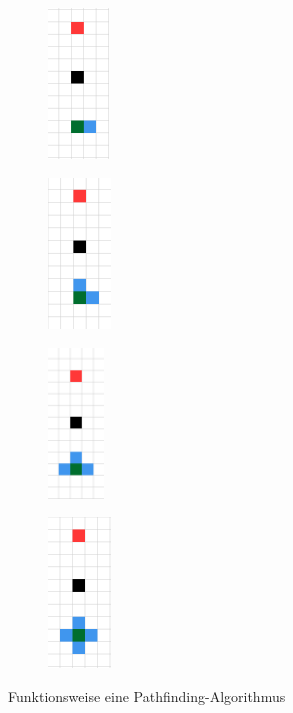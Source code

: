 {{{{			\begin{figure}[H]
				\captionsetup{width=.8\linewidth}
				\centering
				\begin{subfigure}[h]{.19\linewidth}
					\centering
					\includegraphics[scale=0.6, height =4cm]{Bilder/pathfinding_procedure_1.png}
					\label{pic:pathproc1}
				\end{subfigure}%
				\qquad %
				\begin{subfigure}[h]{.19\linewidth}
					\centering
					\includegraphics[scale=0.6, height =4cm]{Bilder/pathfinding_procedure_2.png}
					\label{pic:pathpro2}
				\end{subfigure}%
				\qquad
				\begin{subfigure}[h]{.19\linewidth}
					\centering
					\includegraphics[scale=0.6, height =4cm]{Bilder/pathfinding_procedure_3.png}
					\label{pic:pathproc3}
				\end{subfigure}%
				\qquad %
				\begin{subfigure}[h]{.19\linewidth}
					\centering
					\includegraphics[scale=0.6, height =4cm]{Bilder/pathfinding_procedure_4.png}
					\label{pic:pathproc4}
				\end{subfigure}%
				\caption{Funktionsweise eine Pathfinding-Algorithmus}
				\label{pic:pathproc}
			\end{figure}
			
}}}}

